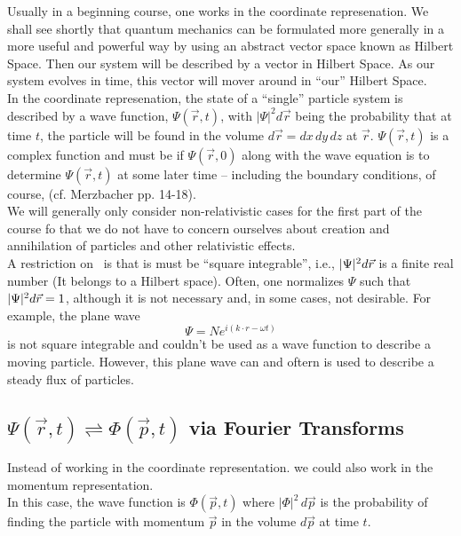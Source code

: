  Usually in a beginning course, one works in the coordinate represenation. We shall see shortly that quantum mechanics can be formulated more
 generally in a more useful and powerful way by using an abstract vector space known as Hilbert Space. Then our system will be described by a 
 vector in Hilbert Space. As our system evolves in time, this vector will mover around in ``our'' Hilbert Space. \\
 
 In the coordinate represenation, the state of a ``single'' particle system is described by a wave function, $\Psi(\vec{r},t)$, with $|\Psi|^2 d\vec{r}$ being
 the probability that at time $t$, the particle will be found in the volume $d\vec{r} = dx\,dy\,dz$ at $\vec{r}$. $\Psi(\vec{r},t)$ is a complex function
 and must be if $\Psi(\vec{r},0)$ along with the wave equation is to determine $\Psi(\vec{r},t)$ at some later time -- including the boundary conditions, 
 of course, (cf. Merzbacher pp. 14-18).\\

We will generally only consider non-relativistic cases for the first part of the course fo that we do not have to concern ourselves about creation
and annihilation of particles and other relativistic effects.\\

A restriction on \Wftn\ is that is must be ``square integrable'', i.e., $|\Psi|^2 d\vec{r}$ is a finite real number (It belongs to a Hilbert space). Often, one normalizes
$\Psi$ such that $|\Psi|^2 d\vec{r} = 1$, although it is not necessary and, in some cases, not desirable. For example, the plane wave
$$\Psi = N e^{i(k\cdot r - \omega t)}$$ is not square integrable and couldn't be used as a wave function to describe a moving particle. However, this
plane wave can and oftern is used to describe a steady flux of particles. 

\subsection{ $\Psi(\vec r, t) \rightleftharpoons \Phi(\vec p, t)$ via Fourier Transforms}
Instead of working in the coordinate representation. we could also work in the momentum
representation.\\

In this case, the wave function is $\Phi(\vec{p},t)$ where $|\Phi|^2\, d\vec{p}$ is the probability of finding the particle with momentum $\vec{p}$ in the volume
$d\vec{p}$ at time $t$. \\

